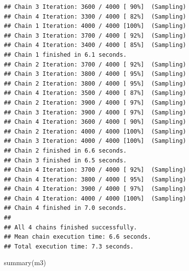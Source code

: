 \documentclass[
]{article}
\newenvironment{Shaded}{\begin{snugshade}}{\end{snugshade}}
\newcommand{\FunctionTok}[1]{\textcolor[rgb]{0.00,0.00,0.00}{#1}}
\newcommand{\NormalTok}[1]{#1}
\begin{document}
\begin{verbatim}
## Chain 3 Iteration: 3600 / 4000 [ 90%]  (Sampling) 
## Chain 4 Iteration: 3300 / 4000 [ 82%]  (Sampling) 
## Chain 1 Iteration: 4000 / 4000 [100%]  (Sampling) 
## Chain 3 Iteration: 3700 / 4000 [ 92%]  (Sampling) 
## Chain 4 Iteration: 3400 / 4000 [ 85%]  (Sampling) 
## Chain 1 finished in 6.1 seconds.
## Chain 2 Iteration: 3700 / 4000 [ 92%]  (Sampling) 
## Chain 3 Iteration: 3800 / 4000 [ 95%]  (Sampling) 
## Chain 2 Iteration: 3800 / 4000 [ 95%]  (Sampling) 
## Chain 4 Iteration: 3500 / 4000 [ 87%]  (Sampling) 
## Chain 2 Iteration: 3900 / 4000 [ 97%]  (Sampling) 
## Chain 3 Iteration: 3900 / 4000 [ 97%]  (Sampling) 
## Chain 4 Iteration: 3600 / 4000 [ 90%]  (Sampling) 
## Chain 2 Iteration: 4000 / 4000 [100%]  (Sampling) 
## Chain 3 Iteration: 4000 / 4000 [100%]  (Sampling) 
## Chain 2 finished in 6.6 seconds.
## Chain 3 finished in 6.5 seconds.
## Chain 4 Iteration: 3700 / 4000 [ 92%]  (Sampling) 
## Chain 4 Iteration: 3800 / 4000 [ 95%]  (Sampling) 
## Chain 4 Iteration: 3900 / 4000 [ 97%]  (Sampling) 
## Chain 4 Iteration: 4000 / 4000 [100%]  (Sampling) 
## Chain 4 finished in 7.0 seconds.
## 
## All 4 chains finished successfully.
## Mean chain execution time: 6.6 seconds.
## Total execution time: 7.3 seconds.
\end{verbatim}

\begin{Shaded}
\begin{Highlighting}[]
\FunctionTok{summary}\NormalTok{(m3)}
\end{Highlighting}
\end{Shaded}
\end{document}
